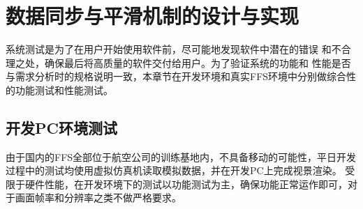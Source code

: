 \chapter{数据同步与平滑机制的设计与实现}
系统测试是为了在用户开始使用软件前，尽可能地发现软件中潜在的错误
和不合理之处，确保最后将高质量的软件交付给用户。为了验证系统的功能和
性能是否与需求分析时的规格说明一致，本章节在开发环境和真实FFS环境中分别做综合性的功能测试和性能测试。

\section{开发PC环境测试}
由于国内的FFS全部位于航空公司的训练基地内，不具备移动的可能性，平日开发过程中的测试均使用虚拟仿真机读取模拟数据，并在开发PC上完成视景渲染。
受限于硬件性能，在开发环境下的测试以功能测试为主，确保功能正常运作即可，对于画面帧率和分辨率之类不做严格要求。
